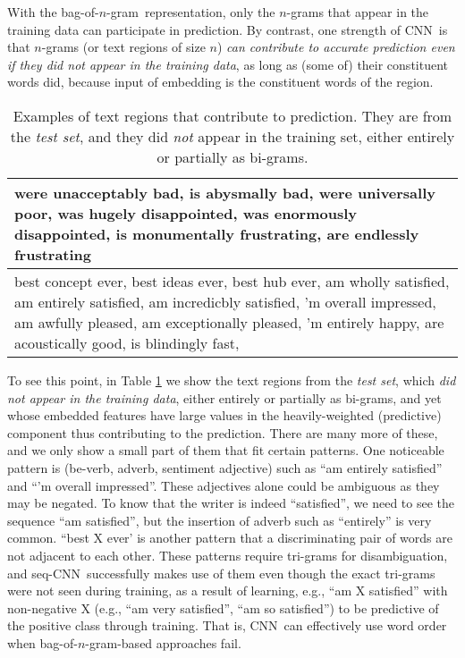 \documentclass[11pt,letterpaper]{article}
\newcommand{\cnn}{CNN}
\newcommand{\scnn}{seq-CNN}
\newcommand{\bongram}{bag-of-$n$-gram}
\begin{document}
With the \bongram\ representation, 
only the $n$-grams that 
appear in the training data can participate in prediction. 
By contrast, 
one strength of \cnn\ is that $n$-grams (or text regions of size $n$) 
{\em can contribute to accurate prediction even if they did not appear in the training data}, 
as long as (some of) their constituent words did, 
because input of embedding is the constituent words of the region.   
\begin{table}
\begin{center}
\begin{footnotesize}
\begin{tabular}{|p{2.9in}|} 
\hline
{\small 
were unacceptably bad, is abysmally bad,  were universally poor, was hugely disappointed, was enormously disappointed, 
is monumentally frustrating,  are endlessly frustrating
}\\
\hline
{\small 
best concept ever, best ideas ever, best hub ever, am wholly satisfied, 
am entirely satisfied, am incredicbly satisfied, 
'm overall impressed, am awfully pleased, 
am exceptionally pleased, 'm entirely happy, 
are acoustically good, is blindingly fast, 
}\\
\hline
\end{tabular}
\end{footnotesize}
\vspace{-0.1in}
\caption{ \label{tab:bv-tstonly} \small
Examples of text regions that contribute to prediction. 
They are from the {\em test set}, and they 
did {\em not} appear in the training set, either entirely or partially as bi-grams.  
}
\end{center}
\end{table}
To see this point, in Table \ref{tab:bv-tstonly} we show the text regions from the {\em test set}, 
which {\em did not appear in the training data}, either entirely or partially as bi-grams, 
and yet whose embedded features have large values in the heavily-weighted (predictive) component 
thus contributing to the prediction.  
There are many more of these, and we only show a small part of them that fit certain patterns.  
One noticeable pattern is (be-verb, adverb, sentiment adjective) such as 
``am entirely satisfied'' and ``'m overall impressed''.  
These adjectives alone could be ambiguous as they may be negated.  To know that the 
writer is indeed ``satisfied'', we need to see the sequence ``am satisfied'', 
but the insertion of adverb such as ``entirely''  
is very common.  ``best X ever' is another pattern that a discriminating pair of words are not adjacent to 
each other.  These patterns require tri-grams for disambiguation, and 
\scnn\ successfully makes use of them even though the exact tri-grams were not seen during training, 
as a result of learning, e.g., ``am X satisfied'' with non-negative X 
(e.g., ``am very satisfied'', ``am so satisfied'') 
to be predictive of the positive class through training. 
That is, 
\cnn\ can effectively use word order when \bongram-based approaches fail.  
\end{document}
